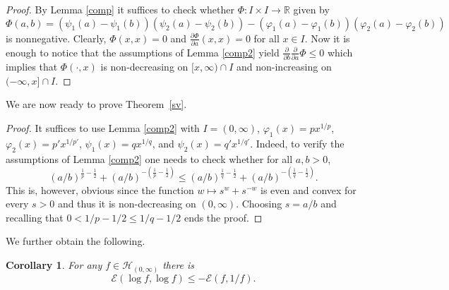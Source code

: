 \documentclass[11pt]{amsart}
\newcommand{\R}{\mathbb{R}}
\newcommand{\1}{\mathbf{1}}
\def\R{{\mathbb R}}
\def\e{{\mathcal{E}}}
\def\H{{\mathcal{H}}}
\theoremstyle{definition}
\theoremstyle{plain}
\newtheorem{corollary}[example]{Corollary}
\theoremstyle{remark}
\newtheorem{remark}[example]{Remark}
\numberwithin{equation}{section}
\begin{document}
\begin{proof}
By Lemma \ref{comp} it suffices to check whether
$\Phi:I \times I \rightarrow \R$ given by
\[
\Phi(a,b)=
(\psi_{1}(a)-\psi_{1}(b))
(\psi_{2}(a)-\psi_{2}(b))-
(\varphi_{1}(a)-\varphi_{1}(b))
(\varphi_{2}(a)-\varphi_{2}(b))
\]
is nonnegative. Clearly, $\Phi(x,x)=0$ and
$\frac{\partial \Phi}{\partial a}(x,x)=0$ for all $x \in I$.
Now it is enough to notice that the assumptions of Lemma \ref{comp2} yield $\frac{\partial}{\partial b}
\frac{\partial}{\partial a}\Phi \leq 0$ which implies
that $\Phi(\cdot,x)$ is non-decreasing on $[x,\infty) \cap I$ and non-increasing on $(-\infty,x] \cap I$.
\end{proof}

We are now ready to prove Theorem~\ref{sv}.

\begin{proof}
It suffices to use Lemma \ref{comp2} with $I=(0,\infty)$,
$\varphi_{1}(x)=px^{1/p}$, $\varphi_{2}(x)=p'x^{1/p'}$,
$\psi_{1}(x)=qx^{1/q}$, and $\psi_{2}(x)=q'x^{1/q'}$.
Indeed, to verify the assumptions of Lemma \ref{comp2} one
needs to check whether for all $a,b>0$, 
%
\[
 (a/b)^{\frac1p -\frac12}+ (a/b)^{-(\frac1p -\frac12)} \leq  (a/b)^{\frac1q -\frac12}+   (a/b)^{-(\frac1q -\frac12)}.
\]
This is, however, obvious since the function $w \mapsto s^{w}+s^{-w}$ is even and convex for every $s>0$ and thus it is non-decreasing on $(0,\infty)$.
Choosing $s=a/b$ and recalling that $0 < 1/p - 1/2 \leq 1/q - 1/2$ ends the proof.
\end{proof}


We further obtain the following.

\begin{corollary} \label{0ls-poin}
For any  $f \in \H_{(0, \infty)}$ there is
\[
\e(\log f, \log f) \leq -\e(f,1/f).
\]
\end{corollary}
\end{document}
